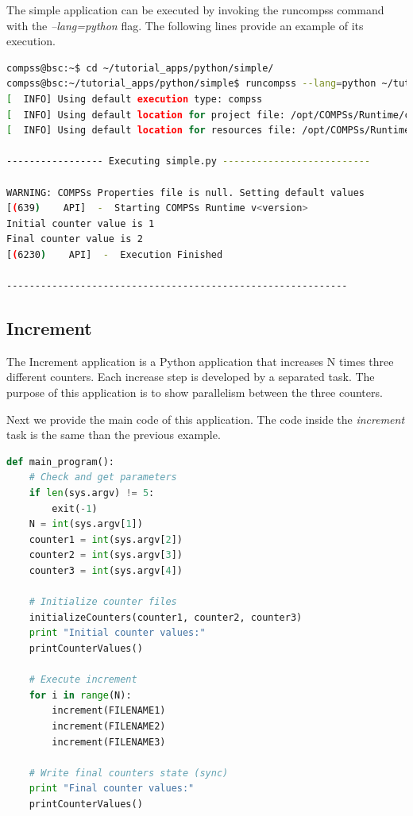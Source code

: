 The simple application can be executed by invoking the runcompss command with the \textit{--lang=python} flag. The following lines provide
an example of its execution.

\begin{lstlisting}[language=bash]
compss@bsc:~$ cd ~/tutorial_apps/python/simple/
compss@bsc:~/tutorial_apps/python/simple$ runcompss --lang=python ~/tutorial_apps/python/simple/simple.py 1
[  INFO] Using default execution type: compss
[  INFO] Using default location for project file: /opt/COMPSs/Runtime/configuration/xml/projects/default_project.xml
[  INFO] Using default location for resources file: /opt/COMPSs/Runtime/configuration/xml/resources/default_resources.xml

----------------- Executing simple.py --------------------------

WARNING: COMPSs Properties file is null. Setting default values
[(639)    API]  -  Starting COMPSs Runtime v<version>
Initial counter value is 1
Final counter value is 2
[(6230)    API]  -  Execution Finished

------------------------------------------------------------
\end{lstlisting}

\subsection{Increment}
The Increment application is a Python application that increases N times three different counters. Each increase step is developed by a separated task. The
purpose of this application is to show parallelism between the three counters.

Next we provide the main code of this application. The code inside the \textit{increment} task is the same than the previous example. 

\begin{lstlisting}[language=python]
 def main_program():
    # Check and get parameters
    if len(sys.argv) != 5:
        exit(-1)
    N = int(sys.argv[1])
    counter1 = int(sys.argv[2])
    counter2 = int(sys.argv[3])
    counter3 = int(sys.argv[4])

    # Initialize counter files
    initializeCounters(counter1, counter2, counter3)
    print "Initial counter values:"
    printCounterValues()

    # Execute increment
    for i in range(N):
        increment(FILENAME1)
        increment(FILENAME2)
        increment(FILENAME3)

    # Write final counters state (sync)
    print "Final counter values:"
    printCounterValues()
\end{lstlisting}

